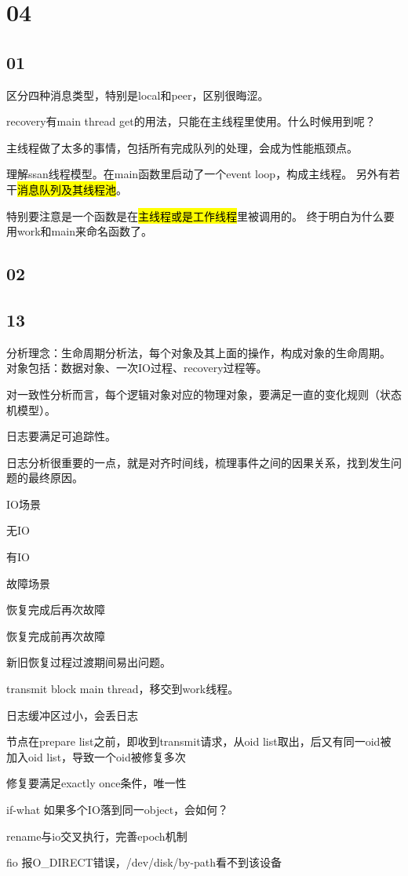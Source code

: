 \section{04}

\subsection{01}

区分四种消息类型，特别是local和peer，区别很晦涩。

recovery有main thread get的用法，只能在主线程里使用。什么时候用到呢？

主线程做了太多的事情，包括所有完成队列的处理，会成为性能瓶颈点。

理解ssan线程模型。在main函数里启动了一个event loop，构成主线程。
另外有若干\hl{消息队列及其线程池}。

特别要注意是一个函数是在\hl{主线程或是工作线程}里被调用的。
终于明白为什么要用work和main来命名函数了。

\subsection{02}

\subsection{13}

分析理念：生命周期分析法，每个对象及其上面的操作，构成对象的生命周期。
对象包括：数据对象、一次IO过程、recovery过程等。

对一致性分析而言，每个逻辑对象对应的物理对象，要满足一直的变化规则（状态机模型）。

日志要满足可追踪性。

日志分析很重要的一点，就是对齐时间线，梳理事件之间的因果关系，找到发生问题的最终原因。

IO场景
\begin{enumbox}
\item 无IO
\item 有IO
\end{enumbox}

故障场景
\begin{enumbox}
\item 恢复完成后再次故障
\item 恢复完成前再次故障
\end{enumbox}

新旧恢复过程过渡期间易出问题。

\begin{enumbox}
\item transmit block main thread，移交到work线程。
\item 日志缓冲区过小，会丢日志
\item 节点在prepare list之前，即收到transmit请求，从oid list取出，后又有同一oid被加入oid list，导致一个oid被修复多次
\item 修复要满足exactly once条件，唯一性
\item if-what 如果多个IO落到同一object，会如何？
\item rename与io交叉执行，完善epoch机制
\item fio 报O\_DIRECT错误，/dev/disk/by-path看不到该设备
\end{enumbox}


